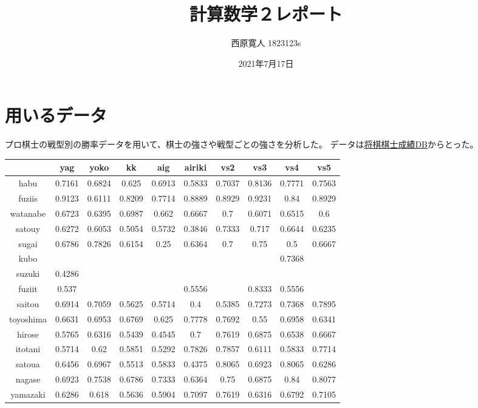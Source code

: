 \documentclass[11pt,a4paper,dvipdfmx]{jsarticle}
\title{計算数学２レポート}
\author{西原寛人 1823123s}
\date{2021年7月17日}
\begin{document}
\maketitle
%
%
\section{用いるデータ}
プロ棋士の戦型別の勝率データを用いて、棋士の強さや戦型ごとの強さを分析した。
データは\href{http://kenyu1234.php.xdomain.jp/menu.php}{将棋棋士成績DB}からとった。
\\
\begin{tabular}{c||c|c|c|c|c|c|c|c|c} 
    & yag & yoko & kk & aig & airiki & vs2 & vs3 & vs4 & vs5 \\ \hline
    habu & 0.7161 & 0.6824 & 0.625 & 0.6913 & 0.5833 & 0.7037 & 0.8136 & 0.7771 & 0.7563 \\
    fuziis & 0.9123 & 0.6111 & 0.8209 & 0.7714 & 0.8889 & 0.8929 & 0.9231 & 0.84 & 0.8929 \\
    watanabe & 0.6723 & 0.6395 & 0.6987 & 0.662 & 0.6667 & 0.7 & 0.6071 & 0.6515 & 0.6 \\
    satouy & 0.6272 & 0.6053 & 0.5054 & 0.5732 & 0.3846 & 0.7333 & 0.717 & 0.6644 & 0.6235 \\
    sugai & 0.6786 & 0.7826 & 0.6154 & 0.25 & 0.6364 & 0.7 & 0.75 & 0.5 & 0.6667 \\
    kubo &  &  &  &  &  &  &  & 0.7368 &  \\
    suzuki & 0.4286 &  &  &  &  &  &  &  &  \\
    fuziit & 0.537 &  &  &  & 0.5556 &  & 0.8333 & 0.5556 &  \\
    saitou & 0.6914 & 0.7059 & 0.5625 & 0.5714 & 0.4 & 0.5385 & 0.7273 & 0.7368 & 0.7895 \\
    toyoshima & 0.6631 & 0.6953 & 0.6769 & 0.625 & 0.7778 & 0.7692 & 0.55 & 0.6958 & 0.6341 \\
    hirose & 0.5765 & 0.6316 & 0.5439 & 0.4545 & 0.7 & 0.7619 & 0.6875 & 0.6538 & 0.6667 \\
    itotani & 0.5714 & 0.62 & 0.5851 & 0.5292 & 0.7826 & 0.7857 & 0.6111 & 0.5833 & 0.7714 \\
    satoua & 0.6456 & 0.6967 & 0.5513 & 0.5833 & 0.4375 & 0.8065 & 0.6923 & 0.8065 & 0.6286 \\
    nagase & 0.6923 & 0.7538 & 0.6786 & 0.7333 & 0.6364 & 0.75 & 0.6875 & 0.84 & 0.8077 \\
    yamazaki & 0.6286 & 0.618 & 0.5636 & 0.5904 & 0.7097 & 0.7619 & 0.6316 & 0.6792 & 0.7105 \\

\end{tabular}
\end{document}
